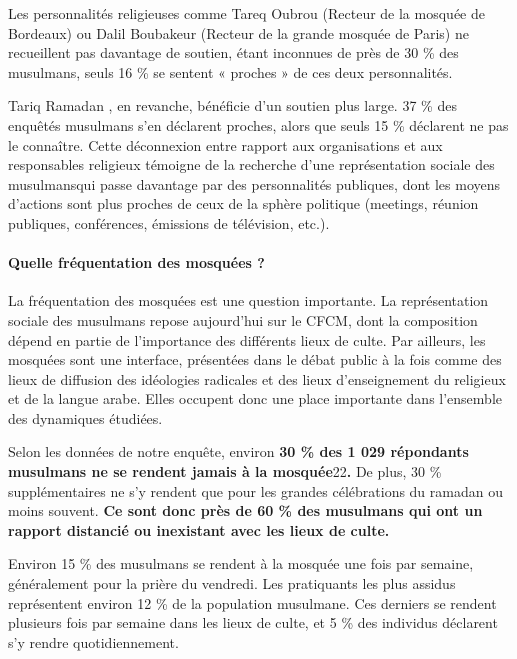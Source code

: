 Les personnalités religieuses comme Tareq Oubrou (Recteur de la mosquée
de Bordeaux) ou Dalil Boubakeur (Recteur de la grande mosquée de Paris)
ne recueillent pas davantage de soutien, étant inconnues de près de 30
\% des musulmans, seuls 16 \% se sentent « proches » de ces deux
personnalités.

Tariq Ramadan \label{Theol:TRamadan1}, en revanche, bénéficie d'un soutien plus large. 37 \% des
enquêtés musulmans s'en déclarent proches, alors que seuls 15 \%
déclarent ne pas le connaître. Cette déconnexion entre rapport aux
organisations et aux responsables religieux témoigne de la recherche
d'une représentation sociale des musulmansqui passe davantage par des personnalités publiques, dont les moyens
d'actions sont plus proches de ceux de la sphère politique (meetings,
réunion publiques, conférences, émissions de télévision, etc.).



\paragraph{Quelle fréquentation des mosquées
?}


La fréquentation des mosquées est une question importante. La
représentation sociale des musulmans repose aujourd'hui sur le CFCM,
dont la composition dépend en partie de l'importance des différents
lieux de culte. Par ailleurs, les mosquées sont une interface,
présentées dans le débat public à la fois comme des lieux de diffusion
des idéologies radicales et des lieux d'enseignement du religieux et de
la langue arabe. Elles occupent donc une place importante dans
l'ensemble des dynamiques étudiées.

Selon les données de notre enquête, environ \textbf{30 \% des 1 029
répondants musulmans ne se rendent jamais à la mosquée}22\textbf{.} De
plus, 30 \% supplémentaires ne s'y rendent que pour les grandes
célébrations du ramadan ou moins souvent. \textbf{Ce sont donc près de
60 \% des musulmans qui ont un rapport distancié ou inexistant avec les
lieux de culte}\textbf{.}

Environ 15 \% des musulmans se rendent à la mosquée une fois par
semaine, généralement pour la prière du vendredi. Les pratiquants les
plus assidus représentent environ 12 \% de la population musulmane. Ces
derniers se rendent plusieurs fois par semaine dans les lieux de culte,
et 5 \% des individus déclarent s'y rendre quotidiennement. 

